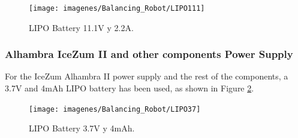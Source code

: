 \begin{center}
	\begin{figure}[H]
		\center
		\texttt{[image: imagenes/Balancing\_Robot/LIPO111]}
		\caption{LIPO Battery 11.1V y 2.2A. }
		\label{fig:lipo111}
	\end{figure}
\end{center}

\subsubsection{Alhambra IceZum II and other components Power Supply}

For the IceZum Alhambra II power supply and the rest of the components, a 3.7V and 4mAh LIPO battery has been used, as shown in Figure \ref{fig:lipo37}. 
\begin{center}
	\begin{figure}[H]
		\center
		\texttt{[image: imagenes/Balancing\_Robot/LIPO37]}
		\caption{LIPO Battery 3.7V y 4mAh.}
		\label{fig:lipo37}
	\end{figure}
\end{center}
\newpage
